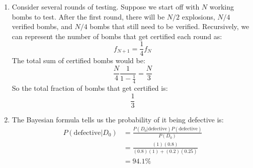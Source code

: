 \begin{sol}
\begin{enumerate}[label=\textbf{(\alph*)}]
\item Consider several rounds of testing. Suppose we start off with $N$ working bombs to test. After the first round, there will be $N/2$ explosions, $N/4$ verified bombs, and $N/4$ bombs that still need to be verified. Recursively, we can represent the number of bombs that get certified each round as:
$$f_{N+1} = \frac{1}{4}f_N$$
The total sum of certified bombs would be:
$$\frac{N}{4}\frac{1}{1-\frac{1}{4}} = \frac{N}{3}$$
So the total fraction of bombs that get certified is:
$$\frac{1}{3}$$
\item The Bayesian formula tells us the probability of it being defective is:
\begin{align*}
P(\text{defective} | D_0) &= \frac{P(D_0 | \text{defective}) P(\text{defective}) }{P(D_0)} \\
&= \frac{(1)(0.8)}{(0.8)(1)+(0.2)(0.25)} \\
&= 94.1\%
\end{align*}
\end{enumerate}
\end{sol}
